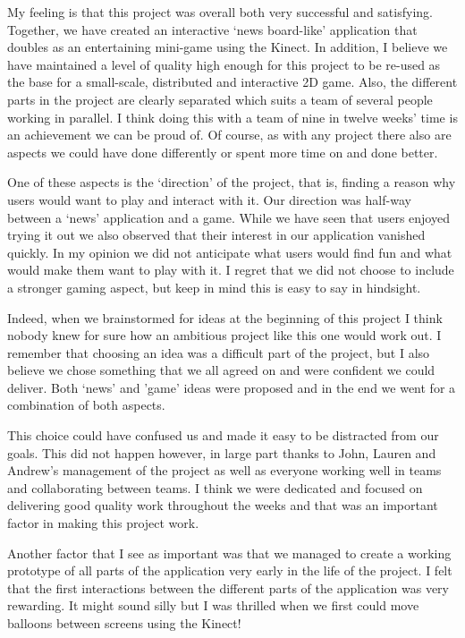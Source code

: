 My feeling is that this project was overall both very successful and satisfying.
Together, we have created an interactive `news board-like' application that doubles
as an entertaining mini-game using the Kinect. In addition, I believe we have 
maintained a level of quality high enough for this project to be re-used as the 
base for a small-scale, distributed and interactive 2D game. Also, the different
parts in the project are clearly separated which suits a team of several people
working in parallel. I think doing this with a team of nine in twelve weeks' 
time is an achievement we can be proud of. Of course, as with any project there 
also are aspects we could have done differently or spent more time on and done better.

One of these aspects is the `direction' of the project, that is, finding a reason
why users would want to play and interact with it. Our direction was half-way
between a `news' application and a game. While we have seen that users enjoyed
trying it out we also observed that their interest in our application vanished
quickly. In my opinion we did not anticipate what users would find fun and what
would make them want to play with it. I regret that we did not choose to include
a stronger gaming aspect, but keep in mind this is easy to say in hindsight.

Indeed, when we brainstormed for ideas at the beginning of this project I think
nobody knew for sure how an ambitious project like this one would work out. I
remember that choosing an idea was a difficult part of the project, but I also
believe we chose something that we all agreed on and were confident we could
deliver. Both `news' and 'game' ideas were proposed and in the end we went for
a combination of both aspects.

This choice could have confused us and made it easy to be distracted from our goals.
This did not happen however, in large part thanks to John, Lauren and Andrew's
management of the project as well as everyone working well in teams and collaborating
between teams. I think we were dedicated and focused on delivering good quality work
throughout the weeks and that was an important factor in making this project work.

Another factor that I see as important was that we managed to create a working
prototype of all parts of the application very early in the life of the project.
I felt that the first interactions between the different parts of the application 
was very rewarding. It might sound silly but I was thrilled when we first could
move balloons between screens using the Kinect!

